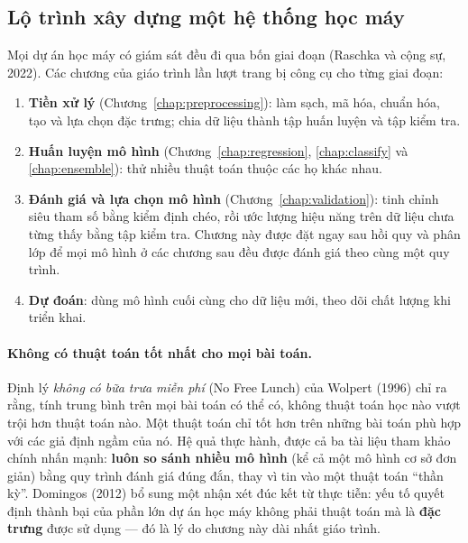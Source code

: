 \subsection{Lộ trình xây dựng một hệ thống học máy}

Mọi dự án học máy có giám sát đều đi qua bốn giai đoạn (Raschka và cộng sự, 2022). Các chương của giáo trình lần lượt trang bị công cụ cho từng giai đoạn:
\begin{enumerate}
    \item \textbf{Tiền xử lý} (Chương~\ref{chap:preprocessing}): làm sạch, mã hóa, chuẩn hóa, tạo và lựa chọn đặc trưng; chia dữ liệu thành tập huấn luyện và tập kiểm tra.
    \item \textbf{Huấn luyện mô hình} (Chương~\ref{chap:regression}, \ref{chap:classify} và \ref{chap:ensemble}): thử nhiều thuật toán thuộc các họ khác nhau.
    \item \textbf{Đánh giá và lựa chọn mô hình} (Chương~\ref{chap:validation}): tinh chỉnh siêu tham số bằng kiểm định chéo, rồi ước lượng hiệu năng trên dữ liệu chưa từng thấy bằng tập kiểm tra. Chương này được đặt ngay sau hồi quy và phân lớp để mọi mô hình ở các chương sau đều được đánh giá theo cùng một quy trình.
    \item \textbf{Dự đoán}: dùng mô hình cuối cùng cho dữ liệu mới, theo dõi chất lượng khi triển khai.
\end{enumerate}


\paragraph{Không có thuật toán tốt nhất cho mọi bài toán.} Định lý \textit{không có bữa trưa miễn phí} (No Free Lunch) của Wolpert (1996) chỉ ra rằng, tính trung bình trên mọi bài toán có thể có, không thuật toán học nào vượt trội hơn thuật toán nào. Một thuật toán chỉ tốt hơn trên những bài toán phù hợp với các giả định ngầm của nó. Hệ quả thực hành, được cả ba tài liệu tham khảo chính nhấn mạnh: \textbf{luôn so sánh nhiều mô hình} (kể cả một mô hình cơ sở đơn giản) bằng quy trình đánh giá đúng đắn, thay vì tin vào một thuật toán ``thần kỳ''. Domingos (2012) bổ sung một nhận xét đúc kết từ thực tiễn: yếu tố quyết định thành bại của phần lớn dự án học máy không phải thuật toán mà là \textbf{đặc trưng} được sử dụng --- đó là lý do chương này dài nhất giáo trình.

